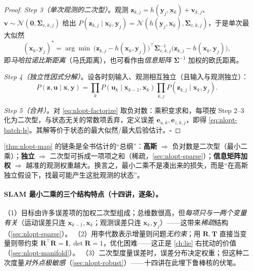 \begin{proof}
\emph{Step 3（单次观测的二次型）}。观测 $\mathbf{z}_{k,j}=h(\mathbf{y}_j,\mathbf{x}_k)+\mathbf{v}_{k,j}$、$\mathbf{v}\sim\mathcal{N}(\mathbf{0},\boldsymbol{\Sigma}_{v,k,j})$ 给出 $P(\mathbf{z}_{k,j}\mid\mathbf{x}_k,\mathbf{y}_j)=\mathcal{N}(h(\mathbf{y}_j,\mathbf{x}_k),\boldsymbol{\Sigma}_{v,k,j})$，于是单次最大似然
\begin{equation}
  (\mathbf{x}_k,\mathbf{y}_j)^*=\arg\min\ \big(\mathbf{z}_{k,j}-h(\mathbf{x}_k,\mathbf{y}_j)\big)^\top\boldsymbol{\Sigma}_{v,k,j}^{-1}\big(\mathbf{z}_{k,j}-h(\mathbf{x}_k,\mathbf{y}_j)\big),
  \label{eq:nlopt-mahal}
\end{equation}
即\emph{马哈拉诺比斯距离}（马氏距离），也可看作由\emph{信息矩阵} $\boldsymbol{\Sigma}^{-1}$ 加权的欧氏距离\cite{gaoxiang2019slam14}。

\emph{Step 4（独立性因式分解）}。设各时刻输入、观测相互独立（且输入与观测独立）：
\begin{equation}
  P(\mathbf{z},\mathbf{u}\mid\mathbf{x},\mathbf{y})=\prod_k P(\mathbf{u}_k\mid\mathbf{x}_{k-1},\mathbf{x}_k)\prod_{k,j}P(\mathbf{z}_{k,j}\mid\mathbf{x}_k,\mathbf{y}_j).
  \label{eq:nlopt-factorize}
\end{equation}

\emph{Step 5（合并）}。对 \cref{eq:nlopt-factorize} 取负对数：乘积变求和，每项按 Step 2--3 化为二次型，与状态无关的常数项丢弃，定义误差 $\mathbf{e}_{u,k},\mathbf{e}_{z,k,j}$，即得 \cref{eq:nlopt-batch-ls}。其解等价于状态的最大似然/最大后验估计。\hfill$\square$
\end{proof}

\begin{insight}
\cref{thm:nlopt-map} 的链条是全书估计的“总纲”：\textbf{高斯} $\Rightarrow$ 负对数是二次型（最小二乘）；\textbf{独立} $\Rightarrow$ 二次型可拆成一项项之和（稀疏，\cref{sec:nlopt-sparse}）；\textbf{信息矩阵加权} $\Rightarrow$ 越准的观测权重越大。换言之，最小二乘不是凑出来的损失，而是“在高斯独立假设下，找最可能产生这批观测的状态”。
\end{insight}

\paragraph{SLAM 最小二乘的三个结构特点（十四讲，逐条）。}\cite{gaoxiang2019slam14}
（1）目标由许多误差项的加权二次型组成；总维数很高，但\emph{每项只与一两个变量有关}（运动误差只连 $\mathbf{x}_{k-1},\mathbf{x}_k$；观测误差只连 $\mathbf{x}_k,\mathbf{y}_j$）——这带来\emph{稀疏}结构（\cref{sec:nlopt-sparse}）。
（2）用李代数表示增量则问题\emph{无约束}；用 $\mathbf{R},\mathbf{T}$ 直接当变量则带约束 $\mathbf{R}^\top\mathbf{R}=\mathbf{I},\det\mathbf{R}=1$，优化困难——这正是 \cref{ch:lie} 右扰动的价值（\cref{sec:nlopt-manifold}）。
（3）二次型度量误差时，误差分布决定权重；但这种二次度量\emph{对外点极敏感}（\cref{sec:nlopt-robust}）——十四讲在此埋下鲁棒核的伏笔。

